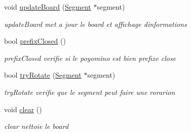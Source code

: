 \begin{DoxyCompactItemize}
void \hyperlink{class_board_a9e49166a714ab1f7f5f7ab5035e05784}{update\+Board} (\hyperlink{class_segment}{Segment} $\ast$segment)
\begin{DoxyCompactList}\small\item\em update\+Board met a jour le board et affichage d\textquotesingle{}informations \end{DoxyCompactList}\item 
bool \hyperlink{class_board_a1884990eae00d36ff465bed7df8ce4fe}{prefix\+Closed} ()
\begin{DoxyCompactList}\small\item\em prefix\+Closed verifie si le poyomino est bien prefixe close \end{DoxyCompactList}\item 
bool \hyperlink{class_board_aea9fad5f32155cf8c6b16254e072f6bd}{try\+Rotate} (\hyperlink{class_segment}{Segment} $\ast$segment)
\begin{DoxyCompactList}\small\item\em try\+Rotate verifie que le segment peut faire une rorarion \end{DoxyCompactList}\item 
void \hyperlink{class_board_af74f0d4b43e5aa3faea16d7c6407b05e}{clear} ()\hypertarget{class_board_af74f0d4b43e5aa3faea16d7c6407b05e}{}\label{class_board_af74f0d4b43e5aa3faea16d7c6407b05e}

\begin{DoxyCompactList}\small\item\em clear nettoie le board \end{DoxyCompactList}\end{DoxyCompactItemize}
